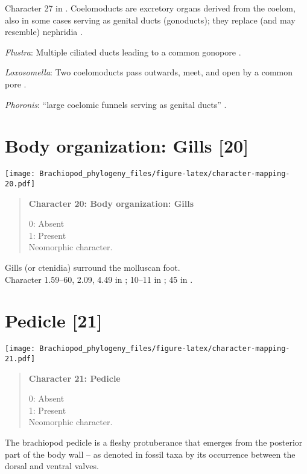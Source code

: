 \documentclass[openany]{book}
\theoremstyle{definition}
\theoremstyle{definition}
\theoremstyle{definition}
\theoremstyle{remark}
\begin{document}
Character 27 in \citet{Haszprunar2000}. Coelomoducts are excretory
organs derived from the coelom, also in some cases serving as genital
ducts (gonoducts); they replace (and may resemble) nephridia
\citep{Goodrich1945}.

\hypertarget{Flustra-coding-19}{}
\emph{Flustra}: Multiple ciliated ducts leading to a common gonopore
\citep{Goodrich1945}.

\hypertarget{Loxosomella-coding-19}{}
\emph{Loxosomella}: Two coelomoducts pass outwards, meet, and open by a
common pore \citep{Goodrich1945}.

\hypertarget{Phoronis-coding-19}{}
\emph{Phoronis}: ``large coelomic funnels serving as genital ducts''
\citep{Goodrich1945}.

\section{Body organization: Gills
{[}20{]}}\label{body-organization-gills-20}

\texttt{[image: Brachiopod\_phylogeny\_files/figure-latex/character-mapping-20.pdf]}

\begin{quote}
\textbf{Character 20: Body organization: Gills}

0: Absent\\
1: Present\\
Neomorphic character.
\end{quote}

Gills (or ctenidia) surround the molluscan foot.\\
Character 1.59--60, 2.09, 4.49 in \citet{SPS1996}; 10--11 in
\citet{Haszprunar2000}; 45 in \citet{Sutton2012}.

\section{Pedicle {[}21{]}}\label{pedicle-21}

\texttt{[image: Brachiopod\_phylogeny\_files/figure-latex/character-mapping-21.pdf]}

\begin{quote}
\textbf{Character 21: Pedicle}

0: Absent\\
1: Present\\
Neomorphic character.
\end{quote}

The brachiopod pedicle is a fleshy protuberance that emerges from the
posterior part of the body wall -- as denoted in fossil taxa by its
occurrence between the dorsal and ventral valves.
\end{document}
